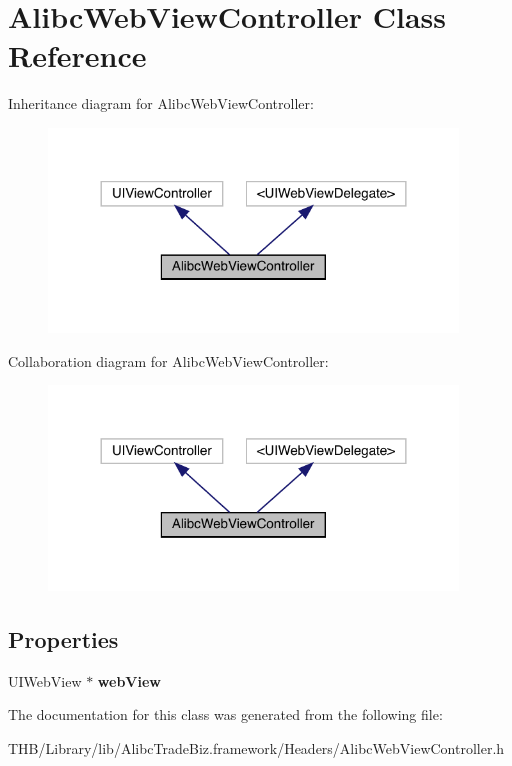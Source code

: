 \hypertarget{interface_alibc_web_view_controller}{}\section{Alibc\+Web\+View\+Controller Class Reference}
\label{interface_alibc_web_view_controller}


Inheritance diagram for Alibc\+Web\+View\+Controller\+:\nopagebreak
\begin{figure}[H]
\begin{center}
\leavevmode
\includegraphics[width=308pt]{interface_alibc_web_view_controller__inherit__graph}
\end{center}
\end{figure}


Collaboration diagram for Alibc\+Web\+View\+Controller\+:\nopagebreak
\begin{figure}[H]
\begin{center}
\leavevmode
\includegraphics[width=308pt]{interface_alibc_web_view_controller__coll__graph}
\end{center}
\end{figure}
\subsection*{Properties}
\begin{DoxyCompactItemize}
\item 
\mbox{\label{interface_alibc_web_view_controller_a4b927683110008af348299963cead227}} 
U\+I\+Web\+View $\ast$ {\bfseries web\+View}
\end{DoxyCompactItemize}


The documentation for this class was generated from the following file\+:\begin{DoxyCompactItemize}
\item 
T\+H\+B/\+Library/lib/\+Alibc\+Trade\+Biz.\+framework/\+Headers/Alibc\+Web\+View\+Controller.\+h\end{DoxyCompactItemize}
